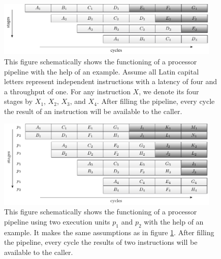 \documentclass{stdlocal}
\begin{document}
    \begin{figure}
      \center
      \includegraphics[width=0.95\textwidth]{figures/pipeline.pdf}
      \caption[Processor Pipeline]{%
        This figure schematically shows the functioning of a processor pipeline with the help of an example.
        Assume all Latin capital letters represent independent instructions with a latency of four and a throughput of one.
        For any instruction $X$, we denote its four stages by $X_1$, $X_2$, $X_3$, and $X_4$.
        After filling the pipeline, every cycle the result of an instruction will be available to the caller.
      }
      \label{fig:pipeline}
    \end{figure}
    \begin{figure}
      \center
      \includegraphics[width=0.95\textwidth]{figures/multiple_unit_pipeline.pdf}
      \caption[Multiple Execution Unit Processor Pipeline]{%
        This figure schematically shows the functioning of a processor pipeline using two execution units $p_1$ and $p_2$ with the help of an example.
        It makes the same assumptions as in figure \ref{fig:pipeline}.
        After filling the pipeline, every cycle the results of two instructions will be available to the caller.
      }
      \label{fig:multiple-unit-pipeline}
    \end{figure}
\end{document}
